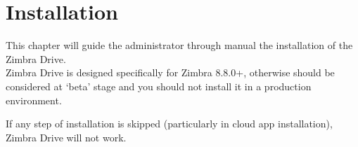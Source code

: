 \chapter{Installation}\label{cha:installation}

This chapter will guide the administrator through manual the installation of the Zimbra Drive.\\
Zimbra Drive is designed specifically for Zimbra 8.8.0+, otherwise should be considered at `beta'
stage and you should not install it in a production environment.\\
\begin{warning}
If any step of installation is skipped (particularly in cloud app installation), Zimbra Drive will not work.
\end{warning}



